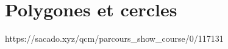 %
%
%
%
%
%
%
%
%


\chapter{Polygones et cercles}
{https://sacado.xyz/qcm/parcours_show_course/0/117131}

